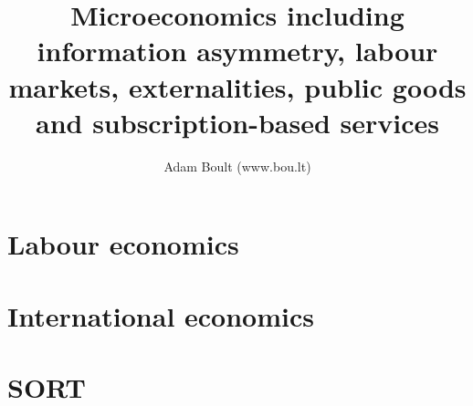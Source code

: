 \documentclass[oneside]{book}
\begin{document}
\author{Adam Boult (www.bou.lt)}
\title{Microeconomics including information asymmetry, labour markets, externalities, public goods and subscription-based services}
\maketitle

\setcounter{tocdepth}{0}
\tableofcontents



\part{Labour economics}



\part{International economics}



\part{SORT}



\end{document}
